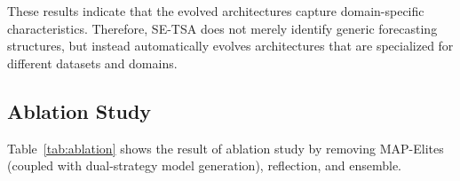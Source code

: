 These results indicate that the evolved architectures capture domain-specific characteristics. Therefore, SE-TSA does not merely identify generic forecasting structures, but instead automatically evolves architectures that are specialized for different datasets and domains.

\begin{nolinenumbers}
\begin{table}[htbp]
\centering
\caption{Ablation study results. Full results are in Appendix~\ref{app:ablation}. All values are average MAE and MAPE (\%) across all conditions. Red background: best result; blue background: second-best result.}
\label{tab:ablation}
\small
\setlength{\tabcolsep}{3pt}
\end{table}
\end{nolinenumbers}

\subsection{Ablation Study}

Table~\ref{tab:ablation} shows the result of ablation study by removing MAP-Elites (coupled with dual-strategy model generation), reflection, and ensemble.

